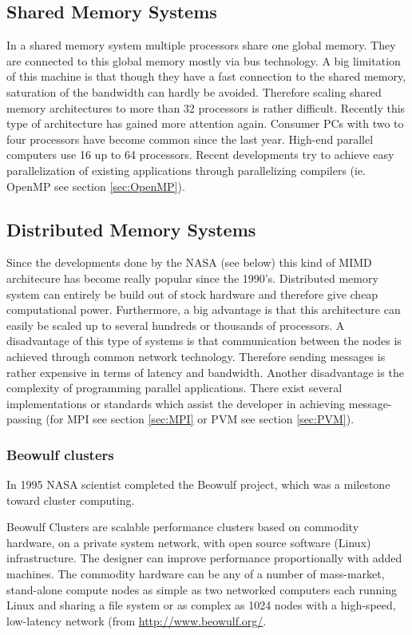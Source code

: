 \subsection{Shared Memory Systems}
\label{sec:sharedmemorysystems}
In a shared memory system multiple processors share one global
memory. They are connected to this global memory mostly via bus
technology. A big limitation of this machine is that though they have
a fast connection to the shared memory, saturation of the bandwidth can
hardly be avoided. Therefore scaling shared memory architectures to
more than 32 processors is rather difficult. Recently this type of
architecture has gained more attention again. Consumer PCs with two to four
processors have become common since the last year. High-end parallel
computers use 16 up to 64 processors. Recent developments try to
achieve easy parallelization of existing applications through
parallelizing compilers (ie. OpenMP see section \ref{sec:OpenMP}).

\subsection{Distributed Memory Systems}

Since the developments done by the NASA (see below)
this kind of MIMD architecure has become really popular since the 1990's.
Distributed memory system can
entirely be build out of stock hardware and therefore give cheap
computational power. Furthermore, a big advantage is that this
architecture can easily be scaled up to several hundreds or thousands
of processors. A disadvantage of this type of systems is that
communication between the nodes is achieved through common network
technology. Therefore sending messages is rather expensive in terms of
latency and bandwidth. Another disadvantage is the complexity of
programming parallel applications. There exist several implementations
or standards which assist the developer in achieving message-passing
(for MPI see section \ref{sec:MPI} or PVM see section \ref{sec:PVM}).

\subsubsection{Beowulf clusters}
In 1995 NASA scientist completed the Beowulf project, which was a
milestone toward cluster computing.

Beowulf Clusters are scalable performance clusters based on commodity
hardware, on a private system network, with open source software
(Linux) infrastructure. The designer can improve performance
proportionally with added machines. The commodity hardware can be any
of a number of mass-market, stand-alone compute nodes as simple as two
networked computers each running Linux and sharing a file system or as
complex as 1024 nodes with a high-speed, low-latency network (from
\url{http://www.beowulf.org/}.


